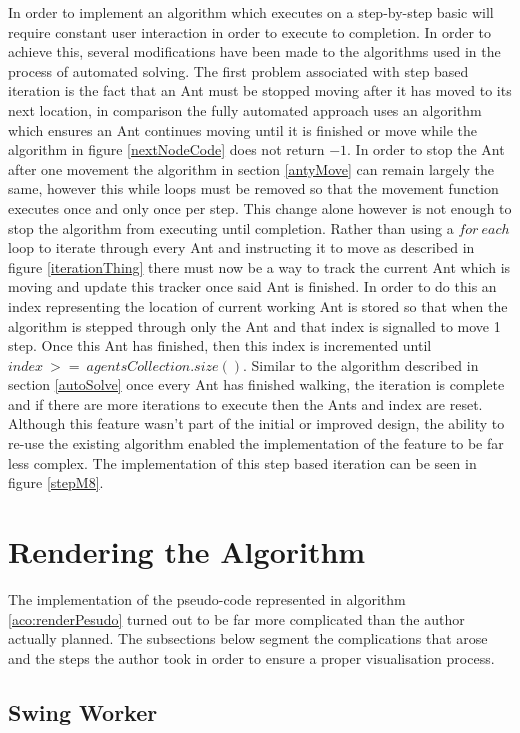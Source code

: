 In order to implement an algorithm which executes on a step-by-step basic will require constant user interaction in order to execute to completion. In order to achieve this, several modifications have been made to the algorithms used in the process of automated solving. The first problem associated with step based iteration is the fact that an Ant must be stopped moving after it has moved to its next location, in comparison the fully automated approach uses an algorithm which ensures an Ant continues moving until it is finished or move while the algorithm in figure \ref{nextNodeCode} does not return $-1$. In order to stop the Ant after one movement the algorithm in section \ref{antyMove} can remain largely the same, however this while loops must be removed so that the movement function executes once and only once per step. This change alone however is not enough to stop the algorithm from executing until completion. Rather than using a $for\ each$ loop to iterate through every Ant and instructing it to move as described in figure \ref{iterationThing} there must now be a way to track the current Ant which is moving and update this tracker once said Ant is finished. In order to do this an index representing the location of current working Ant is stored so that when the algorithm is stepped through only the Ant and that index is signalled to move 1 step. Once this Ant has finished, then this index is incremented until $index\ >=\ agentsCollection.size()$. Similar to the algorithm described in section \ref{autoSolve} once every Ant has finished walking, the iteration is complete and if there are more iterations to execute then the Ants and index are reset. Although this feature wasn’t part of the initial or improved design, the ability to re-use the existing algorithm enabled the implementation of the feature to be far less complex. The implementation of this step based iteration can be seen in figure \ref{stepM8}.

\section{Rendering the Algorithm}

The implementation of the pseudo-code represented in algorithm \ref{aco:renderPesudo} turned out to be far more complicated than the author actually planned. The subsections below segment the complications that arose and the steps the author took in order to ensure a proper visualisation process.

\subsection{Swing Worker}

